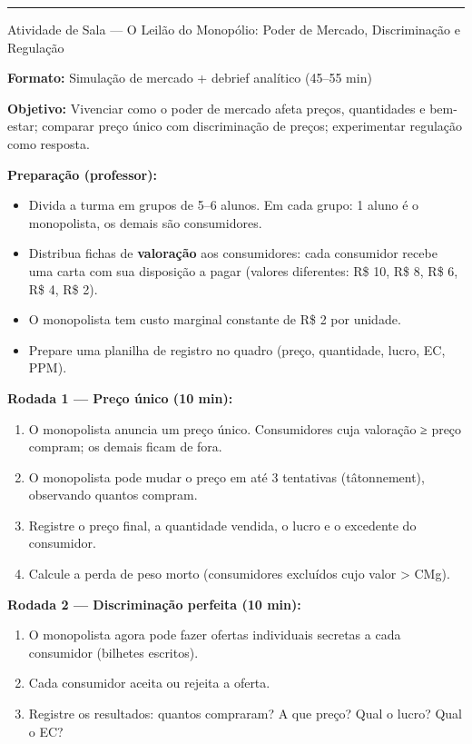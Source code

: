 \documentclass[11pt,twoside,openright]{book}
\providecommand{\tightlist}{\setlength{\itemsep}{0pt}\setlength{\parskip}{0pt}}
\begin{document}
\begin{center}\rule{0.5\linewidth}{0.5pt}\end{center}

\begin{classroombox}{Atividade de Sala — O Leilão do Monopólio: Poder de Mercado, Discriminação e Regulação}

\textbf{Formato:} Simulação de mercado + debrief analítico (45--55 min)

\textbf{Objetivo:} Vivenciar como o poder de mercado afeta preços,
quantidades e bem-estar; comparar preço único com discriminação de
preços; experimentar regulação como resposta.

\textbf{Preparação (professor):}

\begin{itemize}
\tightlist
\item
  Divida a turma em grupos de 5--6 alunos. Em cada grupo: 1 aluno é o
  monopolista, os demais são consumidores.
\item
  Distribua fichas de \textbf{valoração} aos consumidores: cada
  consumidor recebe uma carta com sua disposição a pagar (valores
  diferentes: R\$ 10, R\$ 8, R\$ 6, R\$ 4, R\$ 2).
\item
  O monopolista tem custo marginal constante de R\$ 2 por unidade.
\item
  Prepare uma planilha de registro no quadro (preço, quantidade, lucro,
  EC, PPM).
\end{itemize}

\textbf{Rodada 1 --- Preço único (10 min):}

\begin{enumerate}
\def\labelenumi{\arabic{enumi}.}
\tightlist
\item
  O monopolista anuncia um preço único. Consumidores cuja valoração ≥
  preço compram; os demais ficam de fora.
\item
  O monopolista pode mudar o preço em até 3 tentativas (tâtonnement),
  observando quantos compram.
\item
  Registre o preço final, a quantidade vendida, o lucro e o excedente do
  consumidor.
\item
  Calcule a perda de peso morto (consumidores excluídos cujo valor
  \textgreater{} CMg).
\end{enumerate}

\textbf{Rodada 2 --- Discriminação perfeita (10 min):}

\begin{enumerate}
\def\labelenumi{\arabic{enumi}.}
\tightlist
\item
  O monopolista agora pode fazer ofertas individuais secretas a cada
  consumidor (bilhetes escritos).
\item
  Cada consumidor aceita ou rejeita a oferta.
\item
  Registre os resultados: quantos compraram? A que preço? Qual o lucro?
  Qual o EC?
\end{enumerate}


\end{classroombox}
\end{document}

